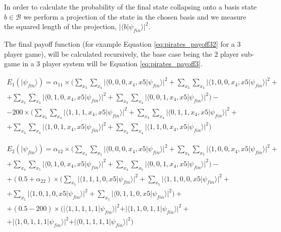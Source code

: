 In order to calculate the probability of the final state collapsing onto a basis state $b \in \mathcal{B}$ we perform a projection of the state in the chosen basis and we measure the squared length of the projection, $\vert\langle b\vert\psi_{fin}\rangle\vert^{2}$\cite{Trueblood}.




The final payoff function (for example Equation \ref{eq:pirates_payoff32} for a $3$ player game), will be calculated recursively, the base case being the $2$ player sub-game in a $3$ player system will be Equation \ref{eq:pirates_payoff3}.

 
\begin{equation}
\begin{split}
E_{1}(\vert\psi_{fin}\rangle)=\alpha_{11}\times(\sum_{x_{3}}\sum_{x_{4}}\vert\langle0,0,0,x_{4},x{5}\vert\psi_{fin}\rangle\vert^{2} + \sum_{x_{3}}\sum_{x_{4}}\vert\langle1,0,0,x_{4},x{5}\vert\psi_{fin}\rangle\vert^{2} + \\ 
+ \sum_{x_{3}}\sum_{x_{4}}\vert\langle0,1,0,x_{4},x{5}\vert\psi_{fin}\rangle\vert^{2}
+ \sum_{x_{3}}\sum_{x_{4}}\vert\langle0,0,1,x_{4},x{5}\vert\psi_{fin}\rangle\vert^{2}
 ) - \\ 
 - 200\times(\sum_{x_{3}}\sum_{x_{4}}\vert\langle1,1,1,x_{4},x{5}\vert\psi_{fin}\rangle\vert^{2} + \sum_{x_{3}}\sum_{x_{4}}\vert\langle0,1,1,x_{4},x{5}\vert\psi_{fin}\rangle\vert^{2} + \\ 
+ \sum_{x_{3}}\sum_{x_{4}}\vert\langle1,0,1,x_{4},x{5}\vert\psi_{fin}\rangle\vert^{2}
+ \sum_{x_{3}}\sum_{x_{4}}\vert\langle1,1,0,x_{4},x{5}\vert\psi_{fin}\rangle\vert^{2}
 ) 
\end{split}
\label{eq:pirates_payoff32:1}
\end{equation}

\begin{equation}
\begin{split}
E_{2}(\vert\psi_{fin}\rangle)=\alpha_{12}\times(\sum_{x_{4}}\sum_{x_{5}}\vert\langle0,0,0,x_{4},x{5}\vert\psi_{fin}\rangle\vert^{2} + \sum_{x_{4}}\sum_{x_{5}}\vert\langle1,0,0,x_{4},x{5}\vert\psi_{fin}\rangle\vert^{2} + \\ 
+ \sum_{x_{4}}\sum_{x_{5}}\vert\langle0,1,0,x_{4},x{5}\vert\psi_{fin}\rangle\vert^{2}
+ \sum_{x_{4}}\sum_{x_{5}}\vert\langle0,0,1,x_{4},x{5}\vert\psi_{fin}\rangle\vert^{2}
 ) - \\
 + (0.5 + \alpha_{22})\times(\sum_{x_{5}}\vert\langle1,1,1,0,x{5}\vert\psi_{fin}\rangle\vert^{2} + \sum_{x_{5}}\vert\langle1,1,0,0,x{5}\vert\psi_{fin}\rangle\vert^{2} + \\ 
+ \sum_{x_{5}}\vert\langle1,0,1,0,x{5}\vert\psi_{fin}\rangle\vert^{2}
+ \sum_{x_{5}}\vert\langle0,1,1,0,x{5}\vert\psi_{fin}\rangle\vert^{2}
 ) + \\ 
+(0.5-200)\times(\vert\langle1,1,1,1,1\vert\psi_{fin}\rangle\vert^{2} + \vert\langle1,1,0,1,1\vert\psi_{fin}\rangle\vert^{2} + \\ 
+ \vert\langle1,0,1,1,1\vert\psi_{fin}\rangle\vert^{2}
+ \vert\langle0,1,1,1,1\vert\psi_{fin}\rangle\vert^{2}
 )
\end{split}
\label{eq:pirates_payoff32:2}
\end{equation}

